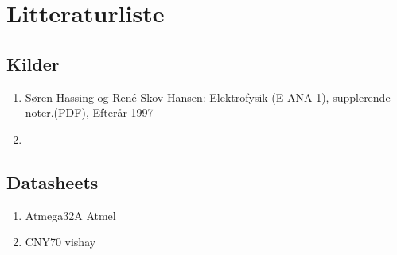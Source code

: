 \section{Litteraturliste}
\subsection{Kilder}
\begin{enumerate}
\item Søren Hassing og René Skov Hansen: Elektrofysik (E-ANA 1), supplerende noter.(PDF), Efterår 1997
\item 
\end{enumerate}

\subsection{Datasheets}
\begin{enumerate}
\item Atmega32A Atmel
\item CNY70 vishay
\end{enumerate}
